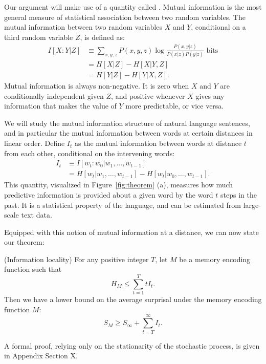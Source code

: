 Our argument will make use of a quantity called . Mutual information is the most general measure of statistical association between two random variables. The mutual information between two random variables $X$ and $Y$, conditional on a third random variable $Z$, is defined as:
\begin{align}
    I[X:Y|Z] &\equiv \sum_{x,y,z} P(x,y,z) \log \frac{P(x,y|z)}{P(x|z)P(y|z)} \text{ bits} \\
    &= H[X|Z] - H[X|Y,Z] \\
    &= H[Y|Z] - H[Y|X,Z].
\end{align}
Mutual information is always non-negative. It is zero when $X$ and $Y$ are conditionally independent given $Z$, and positive whenever $X$ gives any information that makes the value of $Y$ more predictable, or vice versa. 

We will study the mutual information structure of natural language sentences, and in particular the mutual information between words at certain distances in linear order. Define $I_t$ as the mutual information between words at distance $t$ from each other, conditional on the intervening words:
\begin{align}
    I_t &\equiv I[w_t : w_0 | w_1, \dots, w_{t-1}] \\
    &= H[w_t | w_1, \dots, w_{t-1}] - H[w_t | w_0, \dots, w_{t-1}].
\end{align}
This quantity, visualized in Figure~\ref{fig:theorem} (a), measures how much predictive information is provided about a given word by the word $t$ steps in the past.
It is a statistical property of the language, and can be estimated from large-scale text data.

Equipped with this notion of mutual information at a distance, we can now state our theorem:
\begin{thm}\label{prop:suboptimal}(Information locality) For any positive integer $T$, let $M$ be a memory encoding function such that
\begin{equation}
\label{eq:memory-bound}
H_M \le \sum_{t=1}^T t I_t.    
\end{equation}
Then we have a lower bound on the average surprisal under the memory encoding function $M$:
\begin{equation}
\label{eq:surprisal-bound}
S_M \ge S_\infty + \sum_{t=T}^\infty I_t.
\end{equation}
\end{thm}
A formal proof, relying only on the stationarity of the stochastic process, is given in Appendix Section X. 

